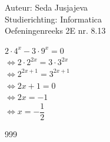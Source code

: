 \documentclass[a4paper]{article}
\begin{document}
\noindent \large Auteur: Seda Jusjajeva\\
\noindent \large Studierichting: Informatica\\
\noindent \large Oefeningenreeks 2E nr. 8.13 \\

\medskip

\normalsize


$2 \cdot 4^x - 3 \cdot 9^x = 0$ \\

$\Leftrightarrow 2 \cdot 2^{2x} = 3 \cdot 3^{2x}$ \\

$\Leftrightarrow 2^{2x+1} = 3^{2x+1}$ \\

$\Leftrightarrow 2x + 1 = 0$ \\

$\Leftrightarrow 2x = -1$ \\

$\Leftrightarrow x = -\dfrac{1}{2}$ \\



\begin{thebibliography}{999}
\end{thebibliography}
\end{document}
